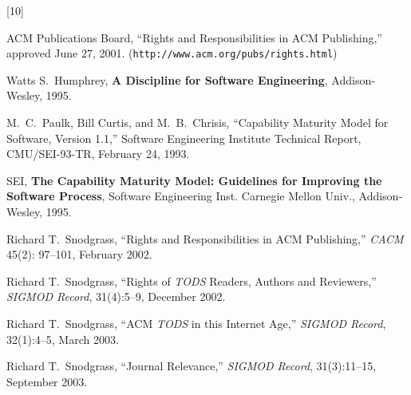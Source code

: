 \documentclass[11pt]{article}
\begin{document}
\pagebreak

\begin{thebibliography}{[10]}

ACM Publications Board, ``Rights and Responsibilities in ACM Publishing,''
approved June 27, 2001. ({\tt http://www.acm.org/pubs/rights.html})

Watts S.~Humphrey, {\bf A Discipline for Software Engineering},
Addison-Wesley, 1995.

M.~C.~Paulk, Bill Curtis, and M.~B.~Chrisis, ``Capability Maturity Model for
Software, Version 1.1,'' Software Engineering Institute Technical Report,
CMU/SEI-93-TR, February 24, 1993.

SEI, {\bf The Capability Maturity Model: Guidelines for Improving the Software
Process}, Software Engineering Inst. Carnegie Mellon Univ., Addison-Wesley,
1995.

Richard T.~Snodgrass, ``Rights and Responsibilities in ACM Publishing,''
{\em CACM} 45(2): 97--101, February 2002.

Richard T.~Snodgrass, ``Rights of {\em TODS} Readers, Authors and
Reviewers,'' {\em SIGMOD Record}, 31(4):5--9, December 2002.

Richard T.~Snodgrass, ``ACM {\em TODS} in this Internet Age,'' {\em
  SIGMOD Record}, 32(1):4--5, March 2003.

Richard T.~Snodgrass, ``Journal Relevance,'' {\em SIGMOD Record},
31(3):11--15, September 2003.
\end{thebibliography}
\end{document}
